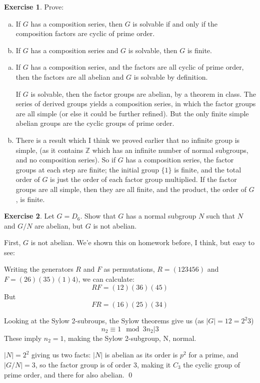 \documentclass[11pt,oneside]{article}
\numberwithin{equation}{section}
\theoremstyle{definition}
\newtheorem{exercise}{Exercise}
\def\ZZ{\mathbb{Z}}
\begin{document}
\begin{exercise}
  Prove:
  
  \begin{enumerate}[(a)]
  \item
    If $G$ has a composition series, then $G$ is solvable if and only if the composition factors are
    cyclic of prime order.
  \item
    If $G$ has a composition series and $G$ is solvable, then $G$ is finite.  
  \end{enumerate}
\end{exercise}

\begin{solution}
  \begin{enumerate}[(a)]
  \item
    If $G$ has a composition series, and the factors are all cyclic of prime order, then the factors are all abelian and $G$ is solvable by definition.

    If $G$ is solvable, then the factor groups are abelian, by a theorem in class.  The series of derived groups yields a
    composition series, in which the factor groups are all simple (or else it could be further refined).  But the only finite
    simple abelian groups are the cyclic groups of prime order.
  \item
    There is a result which I think we proved earlier that no infinite group is simple, (as it contains $\ZZ$ which has
    an infinite number of normal subgroups, and no composition series).  So if $G$ has a composition series, the factor
    groups at each step are finite; the initial group $\{1\}$ is finite, and the total order of $G$ is just the
    order of each factor group multiplied.  If the factor groups are all simple, then they are all finite, and the product, the
    order of $G$, is finite.
  \end{enumerate}
\end{solution}

\begin{exercise}
  Let $G = D_6$.  Show that $G$ has a normal subgroup $N$ such that $N$ and $G/N$ are abelian,
  but $G$ is not abelian.  
\end{exercise}
\begin{solution}
  First, $G$ is not abelian.  We'e shown this on homework before, I think, but easy to see:

  Writing the generators $R$ and $F$ as permutations, $R = (1 2 3 4 5 6)$ and $F = (2 6) ( 3 5) (1) 4)$, we can calculate:
  \[
  RF = (1 2 ) ( 3 6) ( 4 5)
  \]
  But
  \[
  FR = (1 6) ( 2 5) (3 4)
  \]

  Looking at the Sylow 2-subroups, the Sylow theorems give us
  (as $|G| = 12 = 2^2 3$)
  \[
  n_2 \equiv 1 \mod{3}
  n_2 | 3
  \]
  These imply $n_2 = 1$, making the Sylow 2-subgroup, N,  normal.
  
  $|N| = 2^2$ giving us two facts:  $|N|$ is abelian as its order
  is $p^2$ for a prime, and $|G/N| = 3$, so the factor group
  is of order 3, making it $C_3$ the cyclic group of prime order,
  and there for also abelian.
  \qed
\end{solution}
\end{document}

